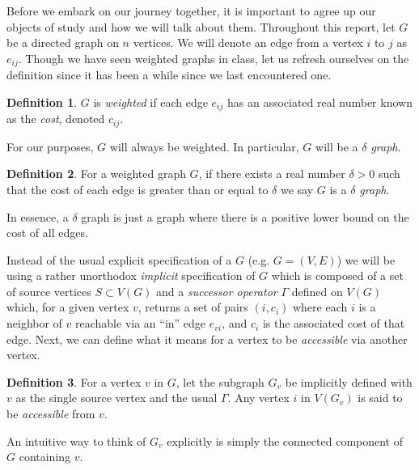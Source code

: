 \documentclass[letterpaper, 10pt]{article}
\newcommand{\keyw}[1]{\textit{\color{magenta}#1}}
\theoremstyle{definition}
\newtheorem{defn}{Definition}[section]
\theoremstyle{Algorithm}
\begin{document}
Before we embark on our journey together, it is important to agree 
up our objects of study and how we will talk about them.
Throughout this report, let $G$ be a directed graph on $n$ vertices.
We will denote an edge from a vertex $i$
to $j$ as $e_{ij}$. Though we have seen weighted graphs in class,
let us refresh ourselves on the definition since it has been a
while since we last encountered one.

\begin{defn}

  $G$ is \keyw{weighted} if each edge $e_{ij}$
  has an associated real number known as the \keyw{cost}, denoted
  $c_{ij}$.

\end{defn}

\noindent For our purposes, $G$ will always be weighted. In particular,
$G$ will be a \emph{$\delta$ graph}.

\begin{defn}

  For a weighted graph $G$, if there exists a real number 
  $\delta > 0$ such that
  the cost of each edge is greater than or equal to $\delta$ we say
  $G$ is a \keyw{$\delta$ graph}.

\end{defn}

\noindent In essence, a $\delta$ graph is just a graph where there is a
positive lower bound on the cost of all edges. 

Instead of the
usual explicit specification of a $G$ (e.g. $G=(V,E)$)
we will be using a rather
unorthodox \emph{implicit} specification of $G$ which is composed 
of a set of source vertices $S\subset V(G)$ and a \keyw{successor
operator} $\Gamma$ defined on $V(G)$ which, for a given vertex $v$, returns a 
set of pairs $(i, c_i)$ where each $i$ is a neighbor of $v$ reachable
via an ``in'' edge $e_{vi}$, and 
$c_i$ is the associated cost of that edge. Next, we can define
what it means for a vertex to be \emph{accessible} via another
vertex.

\begin{defn}
  For a vertex $v$ in $G$, let the subgraph $G_v$ be implicitly 
  defined with $v$ as the single source vertex and the usual $\Gamma$.
  Any vertex $i$ in $V(G_v)$ is said to be \keyw{accessible} from $v$.
\end{defn}

\noindent An intuitive way to think of $G_v$ explicitly is simply the 
connected component of $G$ containing $v$.
\end{document}
